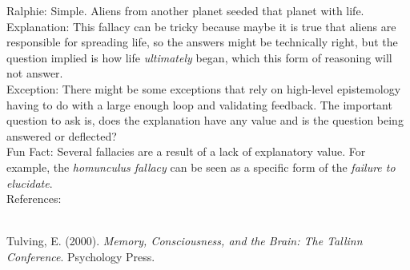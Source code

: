 \documentclass[a4paper,12pt,single,pdftex]{scrbook}
\begin{document}
    
      Ralphie: Simple.  Aliens from another planet seeded that planet with life.
    \\

    
      Explanation: This fallacy can be tricky because maybe it is true that aliens are responsible for spreading life, so the answers might be technically right, but the question implied is how life {\it ultimately}  began, which this form of reasoning will not answer.
    \\

    
      Exception: There might be some exceptions that rely on high-level epistemology having to do with a large enough loop and validating feedback.  The important question to ask is, does the explanation have any value and is the question being answered or deflected?
    \\

    
      Fun Fact: Several fallacies are a result of a lack of explanatory value. For example, the {\em homunculus fallacy} can be seen as a specific form of the {\it failure to elucidate}.
    \\

    References:

    
      
        
      \\

      
        
          Tulving, E. (2000). {\it Memory, Consciousness, and the Brain: The Tallinn Conference}. Psychology Press.
        
      
    
\end{document}
